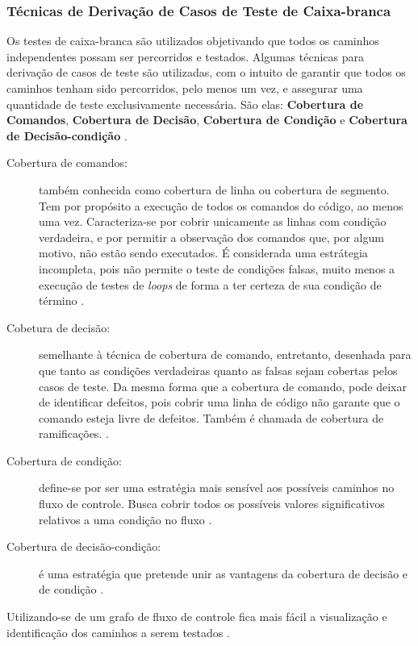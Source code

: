 \subsubsection{Técnicas de Derivação de Casos de Teste de Caixa-branca}
Os testes de caixa-branca são utilizados objetivando que todos os caminhos
independentes possam ser percorridos e testados. Algumas técnicas para
derivação de casos de teste são utilizadas, com o intuito de garantir que todos
os caminhos tenham sido percorridos, pelo menos um vez, e assegurar uma
quantidade de teste exclusivamente necessária. São elas:
\textbf{Cobertura de Comandos}, \textbf{Cobertura de Decisão},
\textbf{Cobertura de Condição} e \textbf{Cobertura de Decisão-condição}
\cite{istqb2014}.

\begin{description}
\item[Cobertura de comandos:] também conhecida como cobertura de linha ou
cobertura de segmento. Tem por propósito a execução de todos os comandos do
código, ao menos uma vez. Caracteriza-se por cobrir unicamente as linhas com
condição verdadeira, e por permitir a observação dos comandos que, por algum
motivo, não estão sendo executados. É considerada uma estrátegia incompleta,
pois não permite o teste de condições falsas, muito menos a execução de testes
de \textit{loops} de forma a ter certeza de sua condição de término
\cite{istqb2014}.
\item[Cobetura de decisão:] semelhante à técnica de cobertura de comando,
entretanto, desenhada para que tanto as condições verdadeiras quanto as falsas
sejam cobertas pelos casos de teste. Da mesma forma que a cobertura de comando,
pode deixar de identificar defeitos, pois cobrir uma linha de código não
garante que o comando esteja livre de defeitos. Também é chamada de cobertura
de ramificações. \cite{istqb2014}.
\item[Cobertura de condição:] define-se por ser uma estratégia mais sensível
aos possíveis caminhos no fluxo de controle. Busca cobrir todos os possíveis
valores significativos relativos a uma condição no fluxo \cite{istqb2014}.
\item[Cobertura de decisão-condição:] é uma estratégia que pretende unir as
vantagens da cobertura de decisão e de condição \cite{istqb2014}.
\end{description}
\par
\indent Utilizando-se de um grafo de fluxo de controle fica mais fácil a
visualização e identificação dos caminhos a serem testados \cite{copeland2003}.
\par
